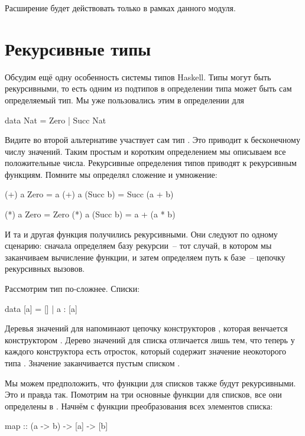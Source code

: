 Расширение будет действовать только в рамках данного модуля.


\section{Рекурсивные типы}

Обсудим ещё одну особенность системы типов Haskell. 
Типы могут быть рекурсивными,
то есть одним из подтипов в определении типа может быть
сам определяемый тип. Мы уже пользовались этим в определении
для 

\begin{code}
data Nat = Zero | Succ Nat
\end{code}

Видите во второй альтернативе участвует сам тип .
Это приводит к бесконечному числу значений. Таким
простым и коротким определением мы описываем все
положительные числа. Рекурсивные определения типов приводят
к рекурсивным функциям. Помните мы определял сложение 
и умножение:

\begin{code}
(+) a Zero     = a
(+) a (Succ b) = Succ (a + b)

(*) a Zero     = Zero
(*) a (Succ b) = a + (a * b)   
\end{code}

И та и другая функция получились рекурсивными.
Они следуют по одному сценарию: сначала определяем базу
рекурсии~-- тот случай, в котором мы заканчиваем 
вычисление функции, и затем определяем путь к базе~--
цепочку рекурсивных вызовов. 

Рассмотрим тип по-сложнее. Списки:

\begin{code}
data [a] = [] | a : [a]
\end{code}

Деревья значений для  напоминают цепочку 
конструкторов , которая венчается конструктором
. Дерево значений для списка отличается лишь тем,
что теперь у каждого конструктора  есть отросток,
который содержит значение неокоторого типа . Значение 
заканчивается пустым списком \In{[]}.

Мы можем предположить, что функции для списков также будут
рекурсивными. Это и правда так. Помотрим на
три основные функции для списков, все они определены в 
. Начнём с функции преобразования всех элементов списка:

\begin{code}
map :: (a -> b) -> [a] -> [b]
\end{code}

